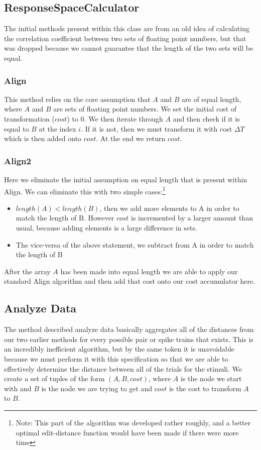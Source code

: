 \documentclass[12pt]{article} %
\begin{document}
\subsection{ResponseSpaceCalculator}
The initial methods present within this class are from an old idea of calculating the correlation coefficient between two sets of floating point numbers, but that was dropped because we cannot guarantee that the length of the two sets will be equal. 
\subsubsection{Align}
This method relies on the core assumption that $A$ and $B$ are of equal length, where $A$ and $B$ are sets of floating point numbers. We set the initial cost of transformation ($cost$) to 0. We then iterate through $A$ and then check if it is equal to $B$ at the index $i$. If it is not, then we must transform it with cost $\Delta T$ which is then added onto $cost$. At the end we return $cost$. 

\subsubsection{Align2}
Here we eliminate the initial assumption on equal length that is present within Align. We can eliminate this with two simple cases:\footnote{Note: This part of the algorithm was developed rather roughly, and a better optimal edit-distance function would have been made if there were more time}
\begin{itemize}
\item $length(A) < length(B)$, then we add more elements to A in order to match the length of B. However $cost$ is incremented by a larger amount than usual, because adding elements is a large difference in sets. 

\item The vice-versa of the above statement, we subtract from A in order to match the length of B 
\end{itemize}
After the array $A$ has been made into equal length we are able to apply our standard Align algorithm and then add that cost onto our cost accumulator here. 

\subsection{Analyze Data}
The method described analyze data basically aggregates all of the distances from our two earlier methods for every possible pair or spike trains that exists. This is an incredibly inefficient algorithm, but by the same token it is unavoidable because we must perform it with this specification so that we are able to effectively determine the distance between all of the trials for the stimuli. We create a set of tuples of the form $(A,B, cost)$, where $A$ is the node we start with and $B$ is the node we are trying to get and $cost$ is the cost to transform $A$ to $B$. 
\end{document}
